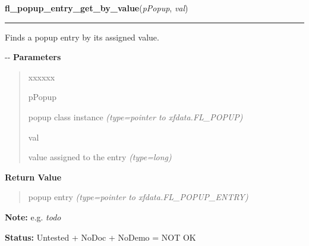     \label{xformslib:flpopup:fl_popup_entry_get_by_value}

    \vspace{0.5ex}

\hspace{.8\funcindent}\begin{boxedminipage}{\funcwidth}

    \raggedright \textbf{fl\_popup\_entry\_get\_by\_value}(\textit{pPopup}, \textit{val})

    \vspace{-1.5ex}

    \rule{\textwidth}{0.5\fboxrule}
\setlength{\parskip}{2ex}

Finds a popup entry by its assigned value.

-{}-
\setlength{\parskip}{1ex}
      \textbf{Parameters}
      \vspace{-1ex}

      \begin{quote}
        \begin{Ventry}{xxxxxx}

          \item[pPopup]


popup class instance
            {\it (type=pointer to xfdata.FL\_POPUP)}

          \item[val]


value assigned to the entry
            {\it (type=long)}

        \end{Ventry}

      \end{quote}

      \textbf{Return Value}
    \vspace{-1ex}

      \begin{quote}

popup entry
      {\it (type=pointer to xfdata.FL\_POPUP\_ENTRY)}

      \end{quote}

\textbf{Note:} 
e.g. \emph{todo}


\textbf{Status:} 
Untested + NoDoc + NoDemo = NOT OK


    \end{boxedminipage}


